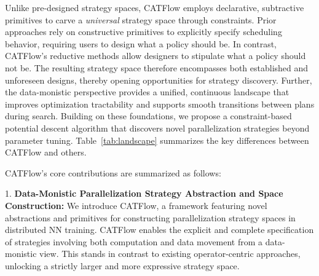 \documentclass[letterpaper,twocolumn,10pt]{article}
\newcommand{\name}{CATFlow}
\begin{document}

Unlike pre-designed strategy spaces, \name{} employs declarative, subtractive primitives to carve a \textit{universal} strategy space through constraints. Prior approaches rely on constructive primitives to explicitly specify scheduling behavior, requiring users to design what a policy should be. In contrast, \name{}'s reductive methods allow designers to stipulate what a policy should not be. The resulting strategy space therefore encompasses both established and unforeseen designs, thereby opening opportunities for strategy discovery. Further, the data-monistic perspective provides a unified, continuous landscape that improves optimization tractability and supports smooth transitions between plans during search. Building on these foundations, we propose a constraint-based potential descent algorithm that discovers novel parallelization strategies beyond parameter tuning. Table~\ref{tab:landscape} summarizes the key differences between \name{} and others.

\name{}'s core contributions are summarized as follows:

1. \textbf{Data-Monistic Parallelization Strategy Abstraction and Space Construction:} We introduce \name{}, a framework featuring novel abstractions and primitives for constructing parallelization strategy spaces in distributed NN training. \name{} enables the explicit and complete specification of strategies involving both computation and data movement from a data-monistic view. This stands in contrast to existing operator-centric approaches, unlocking a strictly larger and more expressive strategy space.
\end{document}
